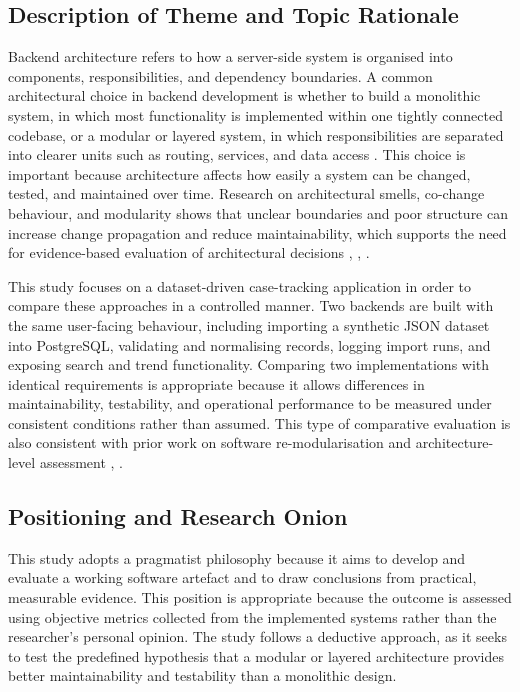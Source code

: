﻿\documentclass[conference]{IEEEtran}
\begin{document}
\subsection{Description of Theme and Topic Rationale}
Backend architecture refers to how a server-side system is organised into components, responsibilities, and dependency boundaries. A common architectural choice in backend development is whether to build a monolithic system, in which most functionality is implemented within one tightly connected codebase, or a modular or layered system, in which responsibilities are separated into clearer units such as routing, services, and data access \cite{b5}. This choice is important because architecture affects how easily a system can be changed, tested, and maintained over time. Research on architectural smells, co-change behaviour, and modularity shows that unclear boundaries and poor structure can increase change propagation and reduce maintainability, which supports the need for evidence-based evaluation of architectural decisions \cite{b1}, \cite{b3}, \cite{b4}.

This study focuses on a dataset-driven case-tracking application in order to compare these approaches in a controlled manner. Two backends are built with the same user-facing behaviour, including importing a synthetic JSON dataset into PostgreSQL, validating and normalising records, logging import runs, and exposing search and trend functionality. Comparing two implementations with identical requirements is appropriate because it allows differences in maintainability, testability, and operational performance to be measured under consistent conditions rather than assumed. This type of comparative evaluation is also consistent with prior work on software re-modularisation and architecture-level assessment \cite{b4}, \cite{b7}.

\subsection{Positioning and Research Onion}
This study adopts a pragmatist philosophy because it aims to develop and evaluate a working software artefact and to draw conclusions from practical, measurable evidence. This position is appropriate because the outcome is assessed using objective metrics collected from the implemented systems rather than the researcher’s personal opinion. The study follows a deductive approach, as it seeks to test the predefined hypothesis that a modular or layered architecture provides better maintainability and testability than a monolithic design.
\end{document}
